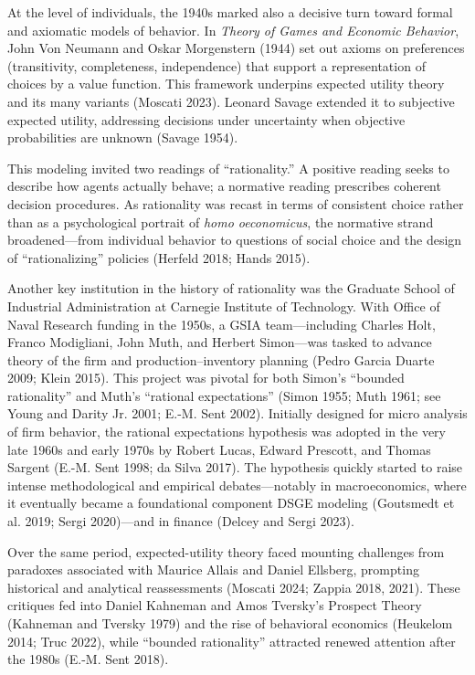 \documentclass[
]{interact}
\begin{document}
At the level of individuals, the 1940s marked also a decisive turn
toward formal and axiomatic models of behavior. In \emph{Theory of Games
and Economic Behavior}, John Von Neumann and Oskar Morgenstern (1944)
set out axioms on preferences (transitivity, completeness, independence)
that support a representation of choices by a value function. This
framework underpins expected utility theory and its many variants
(Moscati 2023). Leonard Savage extended it to subjective expected
utility, addressing decisions under uncertainty when objective
probabilities are unknown (Savage 1954).

This modeling invited two readings of ``rationality.'' A positive
reading seeks to describe how agents actually behave; a normative
reading prescribes coherent decision procedures. As rationality was
recast in terms of consistent choice rather than as a psychological
portrait of \emph{homo oeconomicus}, the normative strand
broadened---from individual behavior to questions of social choice and
the design of ``rationalizing'' policies (Herfeld 2018; Hands 2015).

Another key institution in the history of rationality was the Graduate
School of Industrial Administration at Carnegie Institute of Technology.
With Office of Naval Research funding in the 1950s, a GSIA
team---including Charles Holt, Franco Modigliani, John Muth, and Herbert
Simon---was tasked to advance theory of the firm and
production--inventory planning (Pedro Garcia Duarte 2009; Klein 2015).
This project was pivotal for both Simon's ``bounded rationality'' and
Muth's ``rational expectations'' (Simon 1955; Muth 1961; see Young and
Darity Jr. 2001; E.-M. Sent 2002). Initially designed for micro analysis
of firm behavior, the rational expectations hypothesis was adopted in
the very late 1960s and early 1970s by Robert Lucas, Edward Prescott,
and Thomas Sargent (E.-M. Sent 1998; da Silva 2017). The hypothesis
quickly started to raise intense methodological and empirical
debates---notably in macroeconomics, where it eventually became a
foundational component DSGE modeling (Goutsmedt et al. 2019; Sergi
2020)---and in finance (Delcey and Sergi 2023).

Over the same period, expected-utility theory faced mounting challenges
from paradoxes associated with Maurice Allais and Daniel Ellsberg,
prompting historical and analytical reassessments (Moscati 2024; Zappia
2018, 2021). These critiques fed into Daniel Kahneman and Amos Tversky's
Prospect Theory (Kahneman and Tversky 1979) and the rise of behavioral
economics (Heukelom 2014; Truc 2022), while ``bounded rationality''
attracted renewed attention after the 1980s (E.-M. Sent 2018).
\end{document}
